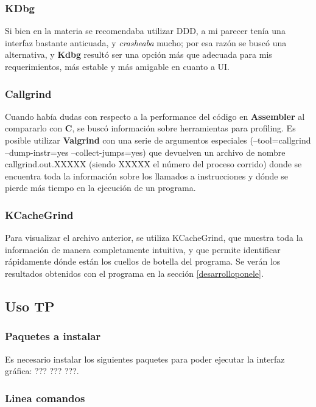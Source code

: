 \documentclass[a4paper,spanish,12pt]{article}
\begin{document}
\subsubsection*{KDbg}
Si bien en la materia se recomendaba utilizar DDD, a mi parecer tenía una interfaz bastante anticuada, y \textit{crasheaba} mucho; por esa razón se buscó una alternativa, y \textbf{Kdbg} resultó ser una opción más que adecuada para mis requerimientos, más estable y más amigable en cuanto a UI.\vspace{\baselineskip}

\subsubsection*{Callgrind}
Cuando había dudas con respecto a la performance del código en \textbf{Assembler} al compararlo con \textbf{C}, se buscó información sobre herramientas para profiling. Es posible utilizar \textbf{Valgrind} con una serie de argumentos especiales (--tool=callgrind --dump-instr=yes --collect-jumps=yes) que devuelven un archivo de nombre callgrind.out.XXXXX (siendo XXXXX el número del proceso corrido) donde se encuentra toda la información sobre los llamados a instrucciones y dónde se pierde más tiempo en la ejecución de un programa.

\subsubsection*{KCacheGrind}
Para visualizar el archivo anterior, se utiliza KCacheGrind, que muestra toda la información de manera completamente intuitiva, y que permite identificar rápidamente dónde están los cuellos de botella del programa. Se verán los resultados obtenidos con el programa en la sección \ref{desarrolloponele}.


\newpage\subsection{Uso TP}
\subsubsection{Paquetes a instalar}
\label{subsec:instalar}
Es necesario instalar los siguientes paquetes para poder ejecutar la interfaz gráfica: ??? ??? ???.

\subsubsection{Linea comandos}
\label{subsec:cli}
\end{document}
